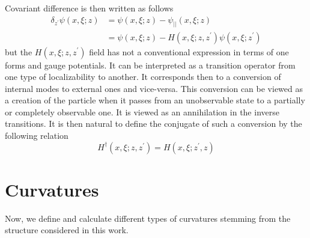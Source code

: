 \documentclass[12pt,a4paper]{article}
\begin{document}
Covariant difference is then written as follows
\begin{align}
\delta_{z^{\prime}}\psi\left(  x,\xi;z\right)   & =\psi\left(  x,\xi;z\right)
-\psi_{||}\left(  x,\xi;z\right) \\
& =\psi\left(  x,\xi;z\right)  -H\left(  x,\xi;z,z^{\prime}\right)
\psi\left(  x,\xi;z^{\prime}\right) \nonumber
\end{align}
but the $H\left(  x,\xi;z,z^{\prime}\right)  $ field has not a conventional
expression in terms of one forms and gauge potentials. It can be interpreted
as a transition operator from one type of localizability to another. It
corresponds then to a conversion of internal modes to external ones and
vice-versa. This conversion can be viewed as a creation of the particle when
it passes from an unobservable state to a partially or completely observable
one. It is viewed as an annihilation in the inverse transitions. It is then
natural to define the conjugate of such a conversion by the following
relation
\begin{equation}
H^{\dagger}\left(  x,\xi;z,z^{\prime}\right)  =H\left(  x,\xi;z^{\prime
},z\right)
\end{equation}

\section{Curvatures}

Now, we define and calculate different types of curvatures stemming from the
structure considered in this work.
\end{document}
